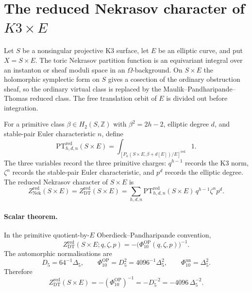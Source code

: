 \providecommand{\kch}{\kappa_{\mathrm{ch}}}
\providecommand{\kcat}{\kappa_{\mathrm{cat}}}
\providecommand{\kBKM}{\kappa_{\mathrm{BKM}}}
\providecommand{\kfib}{\kappa_{\mathrm{fiber}}}
\providecommand{\ZNek}{Z_{\mathrm{Nek}}}
\providecommand{\Zred}{Z^{\mathrm{red}}_{\mathrm{DT}}}
\providecommand{\Mred}{\mathcal{M}^{\mathrm{red}}}
\providecommand{\virred}{[\Mred]^{\mathrm{vir}}}
\providecommand{\PhiOP}{\Phi_{10}^{\mathrm{OP}}}
\providecommand{\Phiun}{\Phi_{10}^{\mathrm{un}}}
\providecommand{\DeltaFive}{\Delta_5}
\providecommand{\Dfive}{D_5}
\providecommand{\Ypos}{Y^{+}}
\providecommand{\CoHA}{\operatorname{CoHA}}
\providecommand{\Rep}{\operatorname{Rep}}

\section*{The reduced Nekrasov character of $K3\times E$}

Let $S$ be a nonsingular projective K3 surface, let $E$ be an elliptic
curve, and put $X=S\times E$.  The toric Nekrasov partition function is
an equivariant integral over an instanton or sheaf moduli space in an
$\Omega$-background.  On $S\times E$ the holomorphic symplectic form on
$S$ gives a cosection of the ordinary obstruction sheaf, so the ordinary
virtual class is replaced by the Maulik--Pandharipande--Thomas reduced
class.  The free translation orbit of $E$ is divided out before
integration.

For a primitive class $\beta\in H_2(S,\mathbb Z)$ with
$\beta^2=2h-2$, elliptic degree $d$, and stable-pair Euler
characteristic $n$, define
\[
  \mathrm{PT}^{\mathrm{red}}_{h,d,n}(S\times E)
  =
  \int_{[P_n(S\times E,\beta+d[E])/E]^{\mathrm{red}}}1 .
\]
The three variables record the three primitive charges:
$q^{h-1}$ records the K3 norm, $\zeta^n$ records the stable-pair Euler
characteristic, and $p^d$ records the elliptic degree.  The reduced
Nekrasov character of $S\times E$ is
\[
  \ZNek^{\mathrm{red}}(S\times E)
  =
  \Zred(S\times E)
  =
  \sum_{h,d,n}
  \mathrm{PT}^{\mathrm{red}}_{h,d,n}(S\times E)\,
  q^{h-1}\zeta^n p^d .
\]

\paragraph{Scalar theorem.}
In the primitive quotient-by-$E$ Oberdieck--Pandharipande convention,
\[
  \Zred(S\times E;q,\zeta,p)
  =
  -\bigl(\PhiOP(q,\zeta,p)\bigr)^{-1}.
\]
The automorphic normalisations are
\[
  \Dfive=64^{-1}\DeltaFive,\qquad
  \PhiOP=\Dfive^2=4096^{-1}\DeltaFive^2,\qquad
  \Phiun=\DeltaFive^2 .
\]
Therefore
\[
  \boxed{\;
  \Zred(S\times E)
  =
  -(\PhiOP)^{-1}
  =
  -\Dfive^{-2}
  =
  -4096\,\DeltaFive^{-2}.
  \;}
\]

